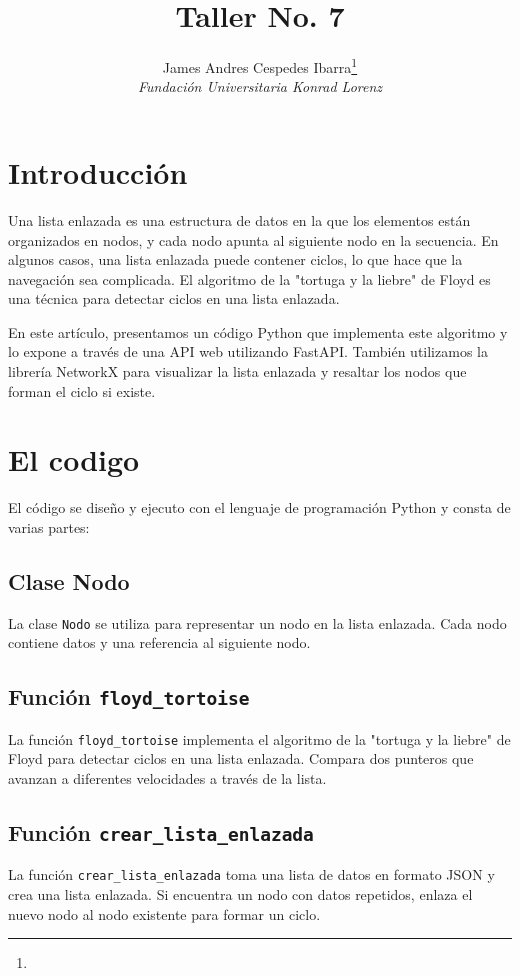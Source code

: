 \documentclass[journal, spanish]{IEEEtran}
\title{Taller No. 7}
\author{James Andres Cespedes Ibarra\thanks{} \\
\textit{Fundación Universitaria Konrad Lorenz} \\
}
\begin{document}
\maketitle

\section{Introducción}
Una lista enlazada es una estructura de datos en la que los elementos están organizados en nodos, y cada nodo apunta al siguiente nodo en la secuencia. En algunos casos, una lista enlazada puede contener ciclos, lo que hace que la navegación sea complicada. El algoritmo de la "tortuga y la liebre" de Floyd es una técnica para detectar ciclos en una lista enlazada.

En este artículo, presentamos un código Python que implementa este algoritmo y lo expone a través de una API web utilizando FastAPI. También utilizamos la librería NetworkX para visualizar la lista enlazada y resaltar los nodos que forman el ciclo si existe.

\section{El codigo}
El código se diseño y ejecuto con el lenguaje de programación Python y consta de varias partes:

\subsection{Clase Nodo}
La clase \texttt{Nodo} se utiliza para representar un nodo en la lista enlazada. Cada nodo contiene datos y una referencia al siguiente nodo.

\lstset{style=codestyle}


\subsection{Función \texttt{floyd\_tortoise}}
La función \texttt{floyd\_tortoise} implementa el algoritmo de la "tortuga y la liebre" de Floyd para detectar ciclos en una lista enlazada. Compara dos punteros que avanzan a diferentes velocidades a través de la lista.



\subsection{Función \texttt{crear\_lista\_enlazada}}
La función \texttt{crear\_lista\_enlazada} toma una lista de datos en formato JSON y crea una lista enlazada. Si encuentra un nodo con datos repetidos, enlaza el nuevo nodo al nodo existente para formar un ciclo.
\end{document}
